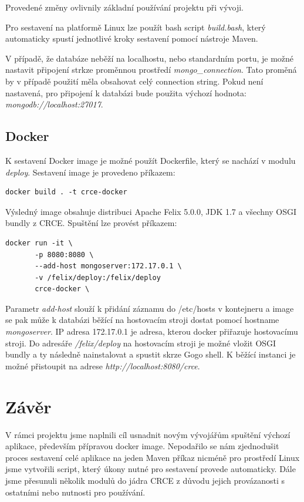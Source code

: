 \documentclass[12pt, a4paper]{article}
\begin{document}
Provedené změny ovlivnily základní používání projektu při vývoji. 

Pro sestavení na platformě Linux lze použít bash script \textit{build.bash}, který automaticky spustí jednotlivé kroky sestavení pomocí nástroje Maven.

V případě, že databáze neběží na localhostu, nebo standardním portu, je možné nastavit připojení strkze proměnnou prostředí \textit{mongo\_connection}. Tato proměná by v případě použití měla obsahovat celý connection string. Pokud není nastavená, pro připojení k databázi bude použita výchozí hodnota: \textit{mongodb://localhost:27017}.

\subsection{Docker}
K sestavení Docker image je možné použít Dockerfile, který se nachází v modulu \textit{deploy}. Sestavení image je provedeno příkazem:

\begin{verbatim}
docker build . -t crce-docker
\end{verbatim} 

Výsledný image obsahuje distribuci Apache Felix 5.0.0, JDK 1.7 a všechny OSGI bundly z CRCE. Spuštění lze provést příkazem:

\begin{verbatim}
docker run -it \ 
	   -p 8080:8080 \
	   --add-host mongoserver:172.17.0.1 \
	   -v /felix/deploy:/felix/deploy
	   crce-docker \
\end{verbatim}

Parametr \textit{add-host} slouží k přidání záznamu do /etc/hosts v kontejneru a image se pak může k databázi běžící na hostovacím stroji dostat pomocí hostname \textit{mongoserver}. IP adresa 172.17.0.1 je adresa, kterou docker přiřazuje hostovacímu stroji. Do adresáře \textit{/felix/deploy} na hostovacím stroji je možné vložit OSGI bundly a ty následně nainstalovat a spustit skrze Gogo shell. K běžící instanci je možné přistoupit na adrese \textit{http://localhost:8080/crce}.


\newpage
\section{Závěr}  %

V rámci projektu jsme naplnili cíl usnadnit novým vývojářům spuštění výchozí aplikace, především přípravou docker image. Nepodařilo se nám zjednodušit proces sestavení celé aplikace na jeden Maven příkaz nicméně pro prostředí Linux jsme vytvořili script, který úkony nutné pro sestavení provede automaticky.
Dále jsme přesunuli několik modulů do jádra CRCE z důvodu jejich provázanosti s ostatními nebo nutnosti pro používání. 
\end{document}
